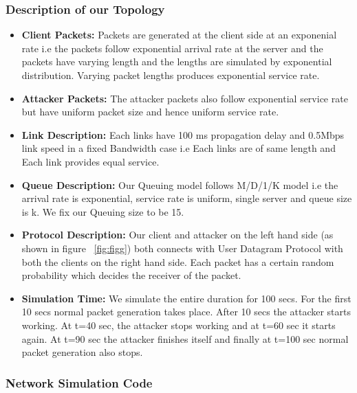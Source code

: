 \subsubsection{Description of our Topology} 

\begin{itemize}

\item \textbf{Client Packets:} Packets are generated at the client side at an exponenial rate i.e the packets follow exponential arrival rate at the server and the packets have varying length and the lengths are simulated by exponential distribution. Varying packet lengths produces exponential service rate.

\item \textbf{Attacker Packets:} The attacker packets also follow exponential service rate but have uniform packet size and hence uniform service rate.

\item \textbf{Link Description:} Each links have 100 ms propagation delay and 0.5Mbps link speed in a fixed Bandwidth case i.e Each links are of same length and Each link provides equal service.

\item \textbf{Queue Description:} Our Queuing model follows M/D/1/K model i.e the arrival rate is exponential, service rate is uniform, single server and queue size is k. We fix our Queuing size to be 15.

\item \textbf{Protocol Description:} Our client and attacker on the left hand side (as shown in figure ~\ref{fig:figg}) both connects with User Datagram Protocol with both the clients on the right hand side. Each packet has a certain random probability which decides the receiver of the packet.

\item \textbf{Simulation Time:} We simulate the entire duration for 100 secs. For the first 10 secs normal packet generation takes place. After 10 secs the attacker starts working. At t=40 sec, the attacker stops working and at t=60 sec it starts again. At t=90 sec the attacker finishes itself and finally at t=100 sec normal packet generation also stops.

\end{itemize}

\subsubsection{Network Simulation Code}


